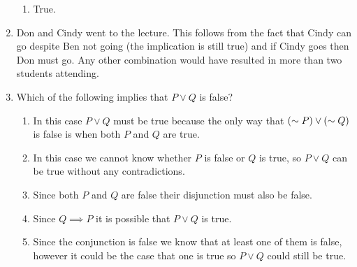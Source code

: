 \documentclass[12pt]{article}
\makeatletter
\newcommand*{\arabicodd}[1]{%
  \expandafter\@arabicodd\csname c@#1\endcsname
}
\newcommand*{\@arabicodd}[1]{%
  \@arabic{\numexpr(#1)*2-1\relax}%
}
\makeatother
\begin{document}
\begin{enumerate}[label=2.\arabicodd*, start=10]
\begin{enumerate}[label=(\alph*)]
          \item True.
        \end{enumerate}
  \item Don and Cindy went to the lecture. This follows from the fact that Cindy
        can go despite Ben not going (the implication is still true) and if Cindy goes
        then Don must go. Any other combination would have resulted in more than two
        students attending.
  \item Which of the following implies that $P \lor Q$ is false?
        \begin{enumerate}[label=(\alph*)]
          \item In this case $P \lor Q$ must be true because the only
                way that $\qty(\sim P) \lor \qty(\sim Q)$ is false is when both
                $P$ and $Q$ are true.
          \item In this case we cannot know whether $P$ is false or
                $Q$ is true, so $P \lor Q$ can be true without any
                contradictions.
          \item Since both $P$ and $Q$ are false their disjunction must
                also be false.
          \item Since $Q \implies P$ it is possible that $P \lor Q$ is true.
          \item Since the conjunction is false we know that at least one of them
                is false, however it could be the case that one is true so $P \lor Q$
                could still be true.
        \end{enumerate}
\end{enumerate}
\end{document}
